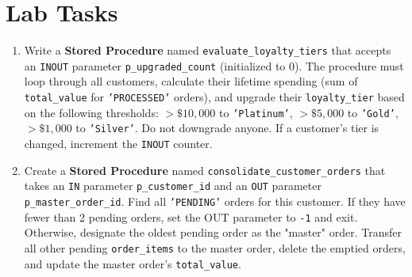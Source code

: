 \documentclass[12pt,a4paper]{article}
\newif\ifshowsolutions
\begin{document}
\section{Lab Tasks}
\begin{enumerate}
    \item Write a \textbf{Stored Procedure} named \texttt{evaluate\_loyalty\_tiers} that accepts an \texttt{INOUT} parameter \texttt{p\_upgraded\_count} (initialized to 0). The procedure must loop through all customers, calculate their lifetime spending (sum of \texttt{total\_value} for \texttt{'PROCESSED'} orders), and upgrade their \texttt{loyalty\_tier} based on the following thresholds: $> \$10,000$ to \texttt{'Platinum'}, $> \$5,000$ to \texttt{'Gold'}, $> \$1,000$ to \texttt{'Silver'}. Do not downgrade anyone. If a customer's tier is changed, increment the \texttt{INOUT} counter.
    
    \ifshowsolutions
    \textbf{Solution:}
    \begin{lstlisting}[language=SQL]
CREATE OR REPLACE PROCEDURE evaluate_loyalty_tiers(INOUT p_upgraded_count INT) 
LANGUAGE plpgsql AS $$
DECLARE 
    v_cust RECORD;
BEGIN
    FOR v_cust IN 
        SELECT c.customer_id, c.loyalty_tier, COALESCE(SUM(o.total_value), 0) AS spend
        FROM customers c LEFT JOIN orders o ON c.customer_id = o.customer_id AND o.status = 'PROCESSED'
        GROUP BY c.customer_id, c.loyalty_tier 
    LOOP
        IF v_cust.spend > 10000 AND v_cust.loyalty_tier != 'Platinum' THEN
            UPDATE customers SET loyalty_tier = 'Platinum' WHERE customer_id = v_cust.customer_id;
            p_upgraded_count := p_upgraded_count + 1;
        ELSIF v_cust.spend > 5000 AND v_cust.loyalty_tier IN ('Bronze', 'Silver') THEN
            UPDATE customers SET loyalty_tier = 'Gold' WHERE customer_id = v_cust.customer_id;
            p_upgraded_count := p_upgraded_count + 1;
        ELSIF v_cust.spend > 1000 AND v_cust.loyalty_tier = 'Bronze' THEN
            UPDATE customers SET loyalty_tier = 'Silver' WHERE customer_id = v_cust.customer_id;
            p_upgraded_count := p_upgraded_count + 1;
        END IF;
    END LOOP;
    COMMIT;
END; 
$$;
    \end{lstlisting}
    \fi

    \item Create a \textbf{Stored Procedure} named \texttt{consolidate\_customer\_orders} that takes an \texttt{IN} parameter \texttt{p\_customer\_id} and an \texttt{OUT} parameter \texttt{p\_master\_order\_id}. Find all \texttt{'PENDING'} orders for this customer. If they have fewer than 2 pending orders, set the OUT parameter to \texttt{-1} and exit. Otherwise, designate the oldest pending order as the "master" order. Transfer all other pending \texttt{order\_items} to the master order, delete the emptied orders, and update the master order's \texttt{total\_value}.


\end{enumerate}
\end{document}
